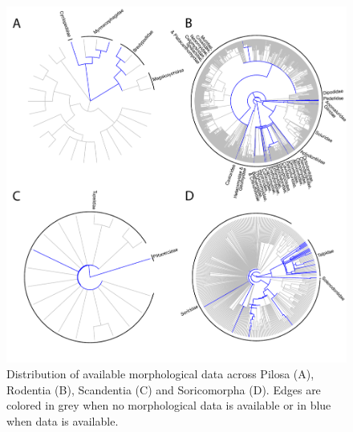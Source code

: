 \begin{figure}[!ht]
\centering
    \includegraphics[width=\textwidth]{Supplementaries/Figures/MissingMammals/Combined_phy3.pdf}
\caption[Available data in Pilosa, Rodentia, Scandentia and Soricomorpha]{Distribution of available morphological data across Pilosa (A), Rodentia (B), Scandentia (C) and Soricomorpha (D). Edges are colored in grey when no morphological data is available or in blue when data is available.}
\label{Supp_combined_phy3}
\end{figure}



